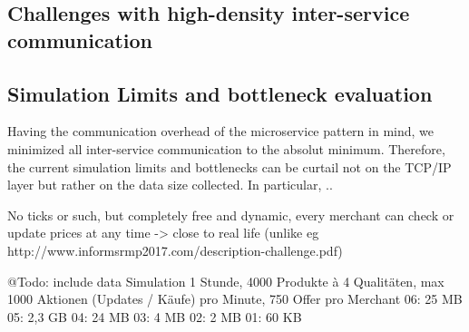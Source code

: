 %
\subsection{Challenges with high-density inter-service communication}
%

%
\subsection{Simulation Limits and bottleneck evaluation}
%
Having the communication overhead of the microservice pattern in mind, we minimized all inter-service communication to the absolut minimum. Therefore, the current simulation limits and bottlenecks can be curtail not on the TCP/IP layer but rather on the data size collected. In particular, ..


No ticks or such, but completely free and dynamic, every merchant can check or update prices at any time -> close to real life (unlike eg http://www.informsrmp2017.com/description-challenge.pdf)



@Todo: include data
Simulation 1 Stunde, 4000 Produkte à 4 Qualitäten, max 1000 Aktionen (Updates / Käufe) pro Minute, 750 Offer pro Merchant
06: 25 MB
05: 2,3 GB
04: 24 MB
03: 4 MB
02: 2 MB
01: 60 KB